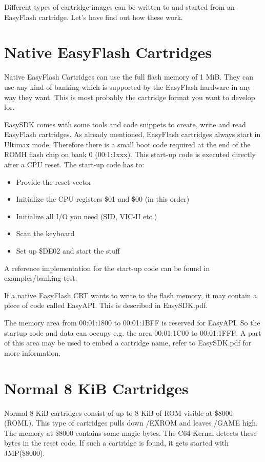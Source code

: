 \documentclass[a4paper,oneside]{memoir}
\begin{document}
Different types of cartridge images can be written to and started from an
EasyFlash cartridge. Let's have find out how these work.

\section{Native EasyFlash Cartridges}\label{native-easyflash-cartridges}

Native EasyFlash Cartridges can use the full flash memory of 1 MiB. They can
use any kind of banking which is supported by the EasyFlash hardware in any way
they want. This is most probably the cartridge format you want to develop for.

EasySDK comes with some tools and code snippets to create, write and read
EasyFlash cartridges.
As already mentioned, EasyFlash cartridges always start in Ultimax mode.
Therefore there is a small boot code required at the end of the ROMH flash chip
on bank 0 (00:1:1xxx). This start-up code is executed directly after a CPU
reset.
The start-up code has to:

\begin{itemize}
  \item Provide the reset vector
  \item Initialize the CPU registers \$01 and \$00 (in this order)
  \item Initialize all I/O you need (SID, VIC-II etc.)
  \item Scan the keyboard
  \item Set up \$DE02 and start the stuff
\end{itemize}

A reference implementation for the start-up code can be found in
examples/banking-test.

If a native EasyFlash CRT wants to write to the flash memory, it may contain a
piece of code called EasyAPI. This is described in EasySDK.pdf.

The memory area from 00:01:1800 to 00:01:1BFF is reserved for EasyAPI. So the
startup code and data can occupy e.g. the area 00:01:1C00 to 00:01:1FFF. A part
of this area may be used to embed a cartridge name, refer to EasySDK.pdf for more information.

\section {Normal 8 KiB Cartridges}

Normal 8 KiB cartridges consist of up to 8 KiB of ROM visible at \$8000 (ROML).
This type of cartridges pulls down /EXROM and leaves /GAME high.
The memory at \$8000 contains some magic bytes. The C64 Kernal detects these
bytes in the reset code. If such a cartridge is found, it gets started with
JMP(\$8000).
\end{document}
